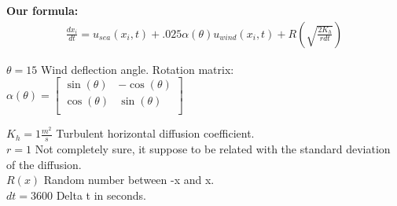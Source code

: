 \documentclass[a4paper,12pt]{article}
\begin{document}
\textbf{Our formula:}
\begin{equation}
\begin{split}
\frac{dx_i}{dt} = u_{sea}(x_i, t) + .025 \alpha(\theta) u_{wind}(x_i,t) + R \left (\sqrt{\frac{2K_h}{r dt}} \right)
\end{split}
\end{equation}

$\theta = 15$ Wind deflection angle. Rotation matrix:  
$
\alpha(\theta)
 = 
    \begin{bmatrix}
        \sin(\theta) & -\cos(\theta) \\
        \cos(\theta) & \sin(\theta) \\
    \end{bmatrix}
$

$K_h  = 1 \frac{m^2}{s}$ Turbulent horizontal diffusion coefficient. \\
$r  = 1$ Not completely sure, it suppose to be related with the standard deviation of the diffusion. \\
$R(x)$ Random number between -x and x. \\
$dt = 3600$ Delta t in seconds.\\
\end{document}
